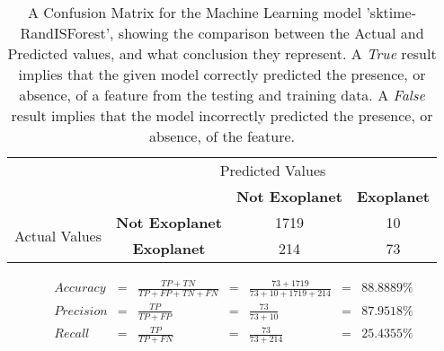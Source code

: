 
    \renewcommand{\arraystretch}{2}
    \renewcommand{\tabcolsep}{20.25pt}
    \begin{table}[ht]
    \begin{tabular}{cccc}
     & \multicolumn{3}{c}{Predicted Values} \\ \cline{3-4}
     & \multicolumn{1}{c|}{} & \multicolumn{1}{c|}{\textbf{Not Exoplanet}} & \multicolumn{1}{c|}{\textbf{Exoplanet}} \\ \cline{2-4}
    \multicolumn{1}{c|}{\multirow{2}{2.0cm}{Actual Values}} & \multicolumn{1}{c|}{\textbf{Not Exoplanet}} & \multicolumn{1}{c|}{1719} & \multicolumn{1}{c|}{10} \\ \cline{2-4}
    \multicolumn{1}{c|}{} & \multicolumn{1}{c|}{\textbf{Exoplanet}} & \multicolumn{1}{c|}{214} & \multicolumn{1}{c|}{73} \\ \cline{2-4}
    \end{tabular}
    \caption{A Confusion Matrix for the Machine Learning model 'sktime-RandISForest', showing the comparison between the Actual and Predicted values, and what conclusion they represent. A \emph{True} result implies that the given model correctly predicted the presence, or absence, of a feature from the testing and training data. A \emph{False} result implies that the model incorrectly predicted the presence, or absence, of the feature.}
    \label{tab:sktime-RandISForestconfusionmatrix}
    \end{table}

    \label{eq:precisionsktime-RandISForest}
    \begin{align*}
        Accuracy &= &\frac{TP + TN}{TP + FP + TN + FN} &= &\frac{73 + 1719}{73 + 10 + 1719 + 214} &= & 88.8889\% \\
        Precision &= &\frac{TP}{TP + FP} &= &\frac{73}{73 + 10} &= & 87.9518\% \\
        Recall &= &\frac{TP}{TP + FN} &= &\frac{73}{73 + 214} &= & 25.4355\% \\
    \end{align*}

    \renewcommand{\arraystretch}{1}
    \renewcommand{\tabcolsep}{5.25pt}
    